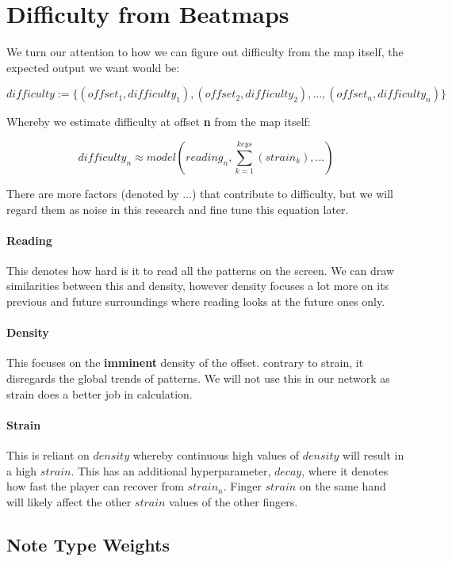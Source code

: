 
\section{Difficulty from Beatmaps}

We turn our attention to how we can figure out difficulty from the map itself, the expected output we want would be:

$$ difficulty := \lbrace(offset_1, difficulty_1), (offset_2, difficulty_2), ..., (offset_n, difficulty_n)\rbrace $$

Whereby we estimate difficulty at offset \textbf{n} from the map itself:

$$ difficulty_n \approx model \left( reading_n, \sum_{k=1}^{keys} \left(strain_k \right), ... \right)$$

There are more factors (denoted by $...$) that contribute to difficulty, but we will regard them as noise in this research and fine tune this equation later.

\paragraph{Reading} This denotes how hard is it to read all the patterns on the screen. We can draw similarities between this and density, however density focuses a lot more on its previous and future surroundings where reading looks at the future ones only. 

\paragraph{Density} This focuses on the \textbf{imminent} density of the offset. contrary to strain, it disregards the global trends of patterns. We will not use this in our network as strain does a better job in calculation.

\paragraph{Strain} This is reliant on $density$ whereby continuous high values of $ density$ will result in a high $strain$. This has an additional hyperparameter, $decay$, where it denotes how fast the player can recover from $strain_n$. Finger $strain$ on the same hand will likely affect the other $strain$ values of the other fingers.

\subsection{Note Type Weights}


